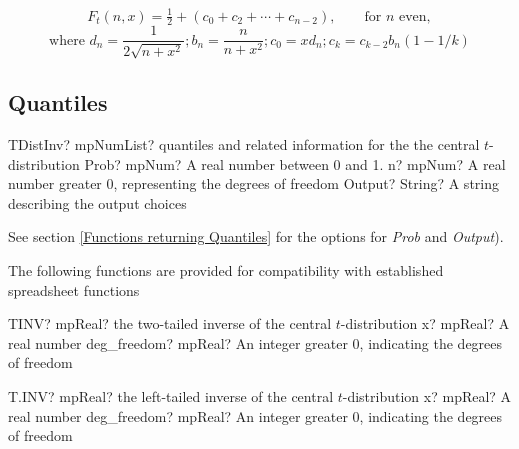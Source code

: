\begin{equation}
F_t\left(n,x\right) =  \tfrac{1}{2} + (c_0 + c_2 +  \cdots +c_{n-2}), \qquad \text{for } n \text{ even},
\end{equation} 
\begin{equation}
\text{where } d_n=\frac{1}{2\sqrt{n+x^2}};  b_n=\frac{n}{n+x^2}; c_0=xd_n; c_k=c_{k-2}b_n(1-1/k) 
\end{equation} 






\subsection{Quantiles}
\label{tDistributionQuantile}

\begin{mpFunctionsExtract}
	\mpFunctionThreeNotImplemented
	{TDistInv? mpNumList? quantiles and related information for the the central $t$-distribution}
	{Prob? mpNum? A real number between 0 and 1.}
	{n? mpNum? A real number greater 0, representing the degrees of freedom}
	{Output? String? A string describing the output choices}
\end{mpFunctionsExtract}

See section \ref{Functions returning Quantiles} for the options for  {\itshape\sffamily Prob} and {\itshape\sffamily Output}). 

\vspace{0.3cm}

The following functions are provided for compatibility with established spreadsheet functions

\vspace{0.3cm}
\begin{mpFunctionsExtract}
	\mpWorksheetFunctionTwoNotImplemented
	{TINV? mpReal? the two-tailed inverse of the central $t$-distribution}
	{x? mpReal? A real number}
	{deg\_freedom? mpReal? An integer  greater 0, indicating the degrees of freedom}
\end{mpFunctionsExtract}

\vspace{0.6cm}
\begin{mpFunctionsExtract}
	\mpWorksheetFunctionTwoNotImplemented
	{T.INV? mpReal? the left-tailed inverse of the central $t$-distribution}
	{x? mpReal? A real number}
	{deg\_freedom? mpReal? An integer  greater 0, indicating the degrees of freedom}
\end{mpFunctionsExtract}


